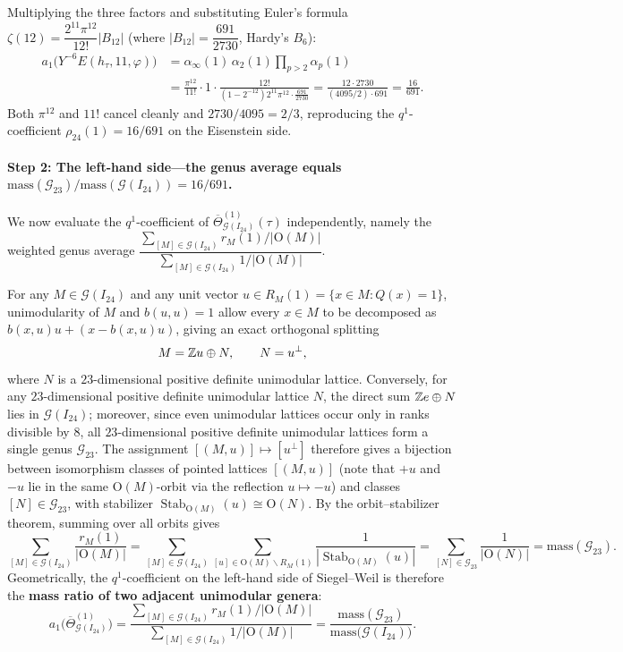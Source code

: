 Multiplying the three factors and substituting Euler's formula $\zeta(12)=\dfrac{2^{11}\pi^{12}}{12!}|B_{12}|$ (where $|B_{12}|=\dfrac{691}{2730}$, Hardy's $B_6$):
\[
\begin{aligned}
a_1\bigl(Y^{-6}E(h_\tau,11,\varphi)\bigr)
&=\alpha_\infty(1)\,\alpha_2(1)\prod_{p>2}\alpha_p(1)\\
&=\frac{\pi^{12}}{11!}\cdot 1\cdot\frac{12!}{(1-2^{-12})2^{11}\pi^{12}\cdot\frac{691}{2730}}
=\frac{12\cdot 2730}{(4095/2)\cdot 691}
=\frac{16}{691}.
\end{aligned}
\]
Both $\pi^{12}$ and $11!$ cancel cleanly and $2730/4095=2/3$, reproducing the $q^1$-coefficient $\rho_{24}(1)=16/691$ on the Eisenstein side.

\paragraph{Step 2: The left-hand side---the genus average equals $\mathrm{mass}(\mathcal G_{23})/\mathrm{mass}(\mathcal G(I_{24}))=16/691$.}
We now evaluate the $q^1$-coefficient of $\overline{\Theta}_{\mathcal G(I_{24})}^{(1)}(\tau)$ independently, namely the weighted genus average $\dfrac{\sum_{[M]\in\mathcal G(I_{24})} r_M(1)/|\mathrm O(M)|}{\sum_{[M]\in\mathcal G(I_{24})} 1/|\mathrm O(M)|}$.

For any $M\in\mathcal G(I_{24})$ and any unit vector $u\in R_M(1)=\{x\in M:Q(x)=1\}$, unimodularity of $M$ and $b(u,u)=1$ allow every $x\in M$ to be decomposed as $b(x,u)u+(x-b(x,u)u)$, giving an exact orthogonal splitting
\[
M=\mathbb{Z} u\oplus N,\qquad N=u^\perp,
\]
where $N$ is a $23$-dimensional positive definite unimodular lattice. Conversely, for any $23$-dimensional positive definite unimodular lattice $N$, the direct sum $\mathbb{Z} e\oplus N$ lies in $\mathcal G(I_{24})$; moreover, since even unimodular lattices occur only in ranks divisible by $8$, all $23$-dimensional positive definite unimodular lattices form a single genus $\mathcal G_{23}$. The assignment $[(M,u)]\mapsto [u^\perp]$ therefore gives a bijection between isomorphism classes of pointed lattices $[(M,u)]$ (note that $+u$ and $-u$ lie in the same $\mathrm O(M)$-orbit via the reflection $u\mapsto -u$) and classes $[N]\in\mathcal G_{23}$, with stabilizer $\operatorname{Stab}_{\mathrm O(M)}(u)\cong\mathrm O(N)$. By the orbit--stabilizer theorem, summing over all orbits gives
\[
\sum_{[M]\in\mathcal G(I_{24})}\frac{r_M(1)}{|\mathrm O(M)|}
=\sum_{[M]\in\mathcal G(I_{24})}\sum_{[u]\in\mathrm O(M)\backslash R_M(1)}\frac{1}{|\operatorname{Stab}_{\mathrm O(M)}(u)|}
=\sum_{[N]\in\mathcal G_{23}}\frac{1}{|\mathrm O(N)|}
=\mathrm{mass}(\mathcal G_{23}).
\]
Geometrically, the $q^1$-coefficient on the left-hand side of Siegel--Weil is therefore the \textbf{mass ratio of two adjacent unimodular genera}:
\[
a_1\bigl(\overline{\Theta}_{\mathcal G(I_{24})}^{(1)}\bigr)
=\frac{\displaystyle\sum_{[M]\in\mathcal G(I_{24})} r_M(1)/|\mathrm O(M)|}
      {\displaystyle\sum_{[M]\in\mathcal G(I_{24})} 1/|\mathrm O(M)|}
=\frac{\mathrm{mass}(\mathcal G_{23})}{\mathrm{mass}\bigl(\mathcal G(I_{24})\bigr)}.
\]

